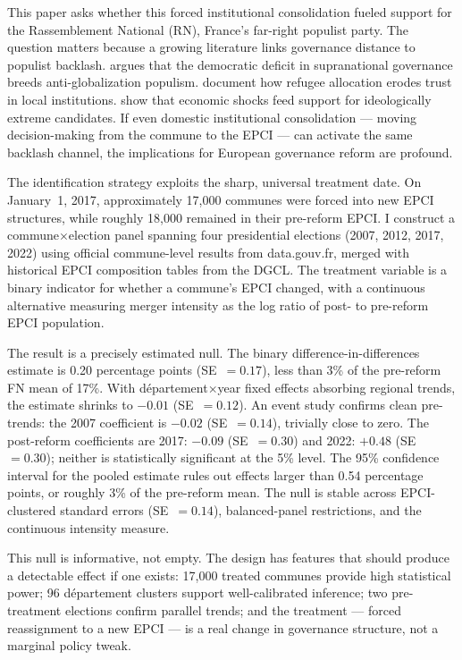 \documentclass[12pt]{article}
\begin{document}
This paper asks whether this forced institutional consolidation fueled support for the Rassemblement National (RN), France's far-right populist party. The question matters because a growing literature links governance distance to populist backlash. \citet{rodrik2021} argues that the democratic deficit in supranational governance breeds anti-globalization populism. \citet{dustmann2017} document how refugee allocation erodes trust in local institutions. \citet{autor2020} show that economic shocks feed support for ideologically extreme candidates. If even domestic institutional consolidation --- moving decision-making from the commune to the EPCI --- can activate the same backlash channel, the implications for European governance reform are profound.

The identification strategy exploits the sharp, universal treatment date. On January~1, 2017, approximately 17,000 communes were forced into new EPCI structures, while roughly 18,000 remained in their pre-reform EPCI. I construct a commune$\times$election panel spanning four presidential elections (2007, 2012, 2017, 2022) using official commune-level results from data.gouv.fr, merged with historical EPCI composition tables from the DGCL. The treatment variable is a binary indicator for whether a commune's EPCI changed, with a continuous alternative measuring merger intensity as the log ratio of post- to pre-reform EPCI population.

The result is a precisely estimated null. The binary difference-in-differences estimate is 0.20 percentage points (SE~$= 0.17$), less than 3\% of the pre-reform FN mean of 17\%. With d\'{e}partement$\times$year fixed effects absorbing regional trends, the estimate shrinks to $-0.01$ (SE~$= 0.12$). An event study confirms clean pre-trends: the 2007 coefficient is $-0.02$ (SE~$= 0.14$), trivially close to zero. The post-reform coefficients are 2017: $-0.09$ (SE~$= 0.30$) and 2022: $+0.48$ (SE~$= 0.30$); neither is statistically significant at the 5\% level. The 95\% confidence interval for the pooled estimate rules out effects larger than 0.54 percentage points, or roughly 3\% of the pre-reform mean. The null is stable across EPCI-clustered standard errors (SE~$= 0.14$), balanced-panel restrictions, and the continuous intensity measure.

This null is informative, not empty. The design has features that should produce a detectable effect if one exists: 17,000 treated communes provide high statistical power; 96 d\'{e}partement clusters support well-calibrated inference; two pre-treatment elections confirm parallel trends; and the treatment --- forced reassignment to a new EPCI --- is a real change in governance structure, not a marginal policy tweak.
\end{document}
